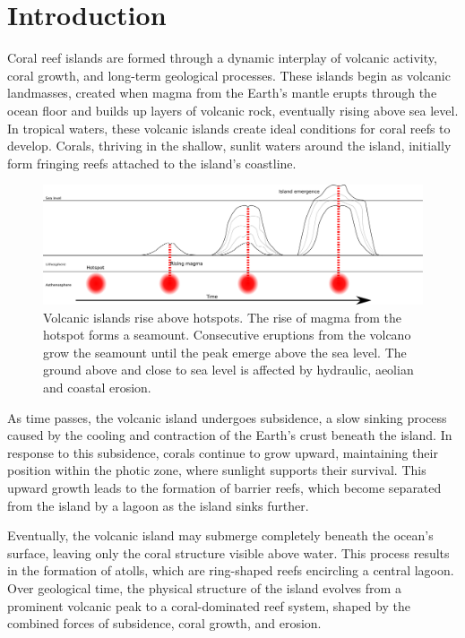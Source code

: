 \minitoc

\section{Introduction}
\label{sec:coral-island_introduction}

Coral reef islands are formed through a dynamic interplay of volcanic activity, coral growth, and long-term geological processes. These islands begin as volcanic landmasses, created when magma from the Earth's mantle erupts through the ocean floor and builds up layers of volcanic rock, eventually rising above sea level. In tropical waters, these volcanic islands create ideal conditions for coral reefs to develop. Corals, thriving in the shallow, sunlit waters around the island, initially form fringing reefs attached to the island's coastline.

\begin{figure}[t]
    \centering
    \includegraphics[width = \linewidth]{islandGrowth.pdf}
    \caption{Volcanic islands rise above hotspots. The rise of magma from the hotspot forms a seamount. Consecutive eruptions from the volcano grow the seamount until the peak emerge above the sea level. The ground above and close to sea level is affected by hydraulic, aeolian and coastal erosion.}
    \label{fig:coral-island_island-growth}
\end{figure}

As time passes, the volcanic island undergoes subsidence, a slow sinking process caused by the cooling and contraction of the Earth's crust beneath the island. In response to this subsidence, corals continue to grow upward, maintaining their position within the photic zone, where sunlight supports their survival. This upward growth leads to the formation of barrier reefs, which become separated from the island by a lagoon as the island sinks further.

Eventually, the volcanic island may submerge completely beneath the ocean's surface, leaving only the coral structure visible above water. This process results in the formation of atolls, which are ring-shaped reefs encircling a central lagoon. Over geological time, the physical structure of the island evolves from a prominent volcanic peak to a coral-dominated reef system, shaped by the combined forces of subsidence, coral growth, and erosion.

